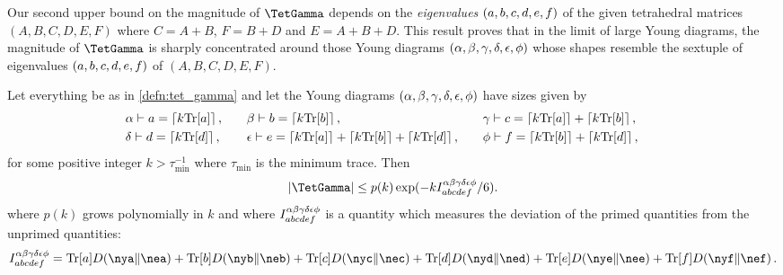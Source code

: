 \documentclass[notitlepage, 10pt]{article}
\begin{document}
Our second upper bound on the magnitude of $\TetGamma$ depends on the \textit{eigenvalues} $(a,b,c,d,e,f)$ of the given tetrahedral matrices $(A, B, C, D, E, F)$ where $C=A+B$, $F=B+D$ and $E=A+B+D$.
This result proves that in the limit of large Young diagrams, the magnitude of $\TetGamma$ is sharply concentrated around those Young diagrams $(\alpha,\beta,\gamma,\delta,\epsilon,\phi)$ whose shapes resemble the sextuple of eigenvalues $(a,b,c,d,e,f)$ of $(A,B,C,D,E,F)$.
\begin{thm}
    \label{thm:abd_dep_upper_bound}
    Let everything be as in \cref{defn:tet_gamma} and let the Young diagrams $(\alpha,\beta,\gamma,\delta,\epsilon,\phi)$ have sizes given by
    \begin{equation}
        \label{eq:ceil_yd_sizes}
        \begin{alignedat}{3}
            &\alpha \vdash a = \left\lceil k{\operatorname{Tr}[a]}\right\rceil, \qquad
            &&\beta \vdash b = \left\lceil k{\operatorname{Tr}[b]}\right\rceil, \qquad
            &&\gamma \vdash c = \left\lceil k{\operatorname{Tr}[a]}\right\rceil+\left\lceil k{\operatorname{Tr}[b]}\right\rceil, \qquad\\
            &\delta \vdash d = \left\lceil k{\operatorname{Tr}[d]}\right\rceil, \qquad
            &&\epsilon \vdash e = \left\lceil k{\operatorname{Tr}[a]}\right\rceil+\left\lceil k{\operatorname{Tr}[b]}\right\rceil+\left\lceil k{\operatorname{Tr}[d]}\right\rceil, \qquad
            &&\phi \vdash f = \left\lceil k{\operatorname{Tr}[b]}\right\rceil+\left\lceil k{\operatorname{Tr}[d]}\right\rceil,
        \end{alignedat}
    \end{equation}
    for some positive integer $k > \tau_{\min}^{-1}$ where $\tau_{\min}$ is the minimum trace.
    Then
    \begin{equation}
        \abs{\TetGamma}
        \leq p(k) \exp(-k I^{\ya\yb\yc\yd\ye\yf}_{\ea\eb\ec\ed\ee\ef}/6).
        \label{eq:tet_gamma_upper_bound}
    \end{equation}
    where $p(k)$ grows polynomially in $k$ and where $I^{\alpha\beta\gamma\delta\epsilon\phi}_{abcdef}$ is a quantity which measures the deviation of the primed quantities from the unprimed quantities:
    \begin{equation}
        I^{\ya\yb\yc\yd\ye\yf}_{\ea\eb\ec\ed\ee\ef}
        ={\tea} \kl{\nya}{\nea}
        +{\teb} \kl{\nyb}{\neb}
        +{\tec} \kl{\nyc}{\nec}
        +{\ted} \kl{\nyd}{\ned}
        +{\tee} \kl{\nye}{\nee}
        +{\tef} \kl{\nyf}{\nef}.
    \end{equation}
\end{thm}
\end{document}
